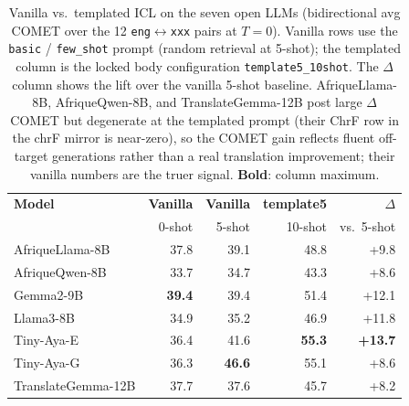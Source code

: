 \begin{table}[t]
\centering
\small
\renewcommand{\arraystretch}{1.05}
\begin{tabular}{lrrrr}
\toprule
\textbf{Model} & \textbf{Vanilla} & \textbf{Vanilla} & \textbf{template5} & \textbf{$\Delta$} \\
  & 0-shot & 5-shot & 10-shot & vs.\ 5-shot \\
\midrule
AfriqueLlama-8B & 37.8 & 39.1 & 48.8 & +9.8 \\
AfriqueQwen-8B & 33.7 & 34.7 & 43.3 & +8.6 \\
Gemma2-9B & \textbf{39.4} & 39.4 & 51.4 & +12.1 \\
Llama3-8B & 34.9 & 35.2 & 46.9 & +11.8 \\
Tiny-Aya-E & 36.4 & 41.6 & \textbf{55.3} & \textbf{+13.7} \\
Tiny-Aya-G & 36.3 & \textbf{46.6} & 55.1 & +8.6 \\
TranslateGemma-12B & 37.7 & 37.6 & 45.7 & +8.2 \\
\bottomrule
\end{tabular}
\caption{Vanilla vs.\ templated ICL on the seven open LLMs (bidirectional avg COMET over the 12 \texttt{eng}$\leftrightarrow$\texttt{xxx} pairs at $T{=}0$). Vanilla rows use the \texttt{basic} / \texttt{few\_shot} prompt (random retrieval at 5-shot); the templated column is the locked body configuration \texttt{template5\_10shot}. The $\Delta$ column shows the lift over the vanilla 5-shot baseline. AfriqueLlama-8B, AfriqueQwen-8B, and TranslateGemma-12B post large $\Delta$ COMET but degenerate at the templated prompt (their ChrF row in the chrF mirror is near-zero), so the COMET gain reflects fluent off-target generations rather than a real translation improvement; their vanilla numbers are the truer signal. \textbf{Bold}: column maximum.}
\label{tab:prompt_engineering_open_comet}
\end{table}
